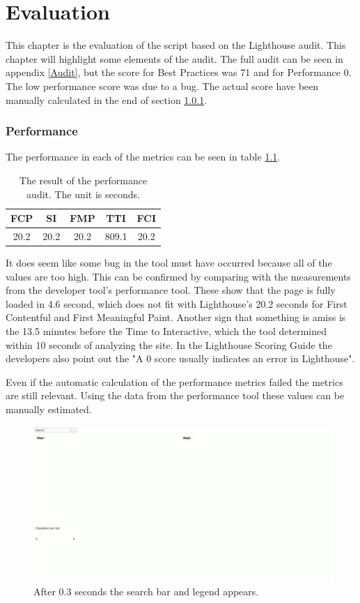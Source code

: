 \chapter{Evaluation}\label{Eval}
This chapter is the evaluation of the script based on the Lighthouse audit. This chapter will highlight some elements of the audit. The full audit can be seen in appendix \ref{Audit}, but the score for Best Practices was 71 and for Performance 0. The low performance score was due to a bug. The actual score have been manually calculated in the end of section \ref{EvalPerform}. 

\subsection{Performance}\label{EvalPerform}
The performance in each of the metrics can be seen in table \ref{PerformanceAuditValues}.

\begin{table}[htbp]
	\centering
	\begin{tabular}{|c|c|c|c|c|}
		\hline 
		FCP & SI & FMP & TTI & FCI \\ 
		\hline 
		20.2 & 20.2 & 20.2 & 809.1 & 20.2 \\ 
		\hline 
	\end{tabular} 
	\caption{The result of the performance audit. The unit is seconds.}
	\label{PerformanceAuditValues}
\end{table}

It does seem like some bug in the tool must have occurred because all of the values are too high. This can be confirmed by comparing with the measurements from the developer tool’s performance tool. These show that the page is fully loaded in 4.6 second, which does not fit with Lighthouse’s 20.2 seconds for First Contentful and First Meaningful Paint. Another sign that something is amiss is the 13.5 minutes before the Time to Interactive, which the tool determined within 10 seconds of analyzing the site. In the Lighthouse Scoring Guide the developers also point out the "A 0 score usually indicates an error in Lighthouse"\citep{ScoringZeroIsBad}.

Even if the automatic calculation of the performance metrics failed the metrics are still relevant. Using the data from the performance tool these values can be manually estimated. 

\begin{figure} [H]
	\centering
	\includegraphics[width=.8\textwidth]{Pictures/ScreenshotLoading1}
	\caption{After 0.3 seconds the search bar and legend appears.}
	\label{ScreenshotLoading1}
\end{figure}

